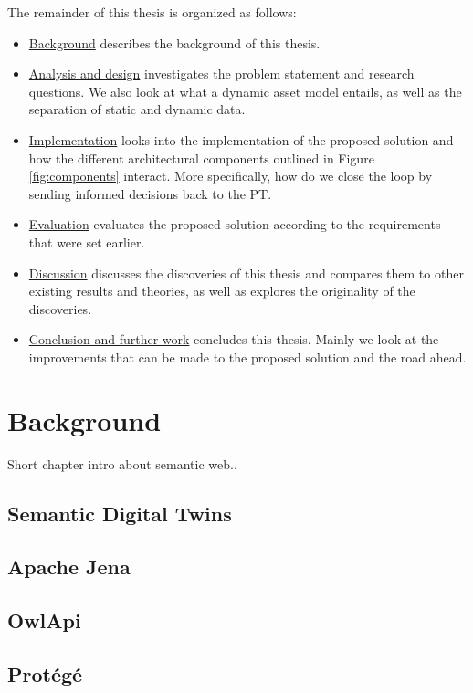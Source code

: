 \documentclass{article}
\begin{document}
The remainder of this thesis is organized as follows:
\begin{itemize}
    \item \hyperref[sec:Background]{Background} describes the background of this thesis.
    \item \hyperref[sec:Analysis]{Analysis and design} investigates the problem statement and research questions. We also look at what a dynamic asset model entails, as well as the separation of static and dynamic data.
    \item \hyperref[sec:Implementation]{Implementation} looks into the implementation of the proposed solution and how the different architectural components outlined in Figure \ref{fig:components} interact. More specifically, how do we close the loop by sending informed decisions back to the PT. 
    \item \hyperref[sec:Evaluation]{Evaluation} evaluates the proposed solution according to the requirements that were set earlier.
    \item \hyperref[sec:Discussion]{Discussion} discusses the discoveries of this thesis and compares them to other existing results and theories, as well as explores the originality of the discoveries.
    \item \hyperref[sec:Conclusion]{Conclusion and further work} concludes this thesis. Mainly we look at the improvements that can be made to the proposed solution and the road ahead.  
\end{itemize}



\newpage
\section{Background}\label{sec:Background}
Short chapter intro about semantic web..

\subsection{Semantic Digital Twins}
\subsection{Apache Jena}
\subsection{OwlApi}
\subsection{Protégé}
\end{document}
